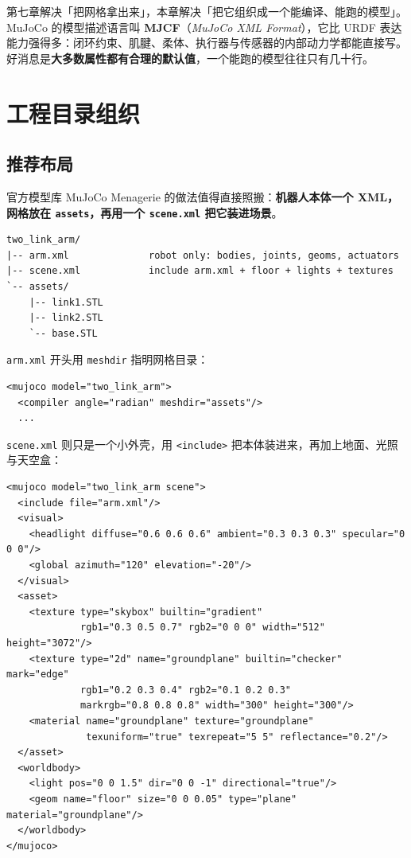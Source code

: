 
第七章解决「把网格拿出来」，本章解决「把它组织成一个能编译、能跑的模型」。MuJoCo 的模型描述语言叫 \textbf{MJCF}（\textit{MuJoCo XML Format}），它比 URDF 表达能力强得多：闭环约束、肌腱、柔体、执行器与传感器的内部动力学都能直接写。好消息是\textbf{大多数属性都有合理的默认值}，一个能跑的模型往往只有几十行。

\section{工程目录组织}

\subsection{推荐布局}

官方模型库 MuJoCo Menagerie 的做法值得直接照搬：\textbf{机器人本体一个 XML，网格放在 \texttt{assets}，再用一个 \texttt{scene.xml} 把它装进场景}。

\begin{lstlisting}[style=code]
two_link_arm/
|-- arm.xml              robot only: bodies, joints, geoms, actuators
|-- scene.xml            include arm.xml + floor + lights + textures
`-- assets/
    |-- link1.STL
    |-- link2.STL
    `-- base.STL
\end{lstlisting}

\texttt{arm.xml} 开头用 \texttt{meshdir} 指明网格目录：

\begin{lstlisting}[style=xml]
<mujoco model="two_link_arm">
  <compiler angle="radian" meshdir="assets"/>
  ...
\end{lstlisting}

\texttt{scene.xml} 则只是一个小外壳，用 \texttt{<include>} 把本体装进来，再加上地面、光照与天空盒：

\begin{lstlisting}[style=xml]
<mujoco model="two_link_arm scene">
  <include file="arm.xml"/>
  <visual>
    <headlight diffuse="0.6 0.6 0.6" ambient="0.3 0.3 0.3" specular="0 0 0"/>
    <global azimuth="120" elevation="-20"/>
  </visual>
  <asset>
    <texture type="skybox" builtin="gradient"
             rgb1="0.3 0.5 0.7" rgb2="0 0 0" width="512" height="3072"/>
    <texture type="2d" name="groundplane" builtin="checker" mark="edge"
             rgb1="0.2 0.3 0.4" rgb2="0.1 0.2 0.3"
             markrgb="0.8 0.8 0.8" width="300" height="300"/>
    <material name="groundplane" texture="groundplane"
              texuniform="true" texrepeat="5 5" reflectance="0.2"/>
  </asset>
  <worldbody>
    <light pos="0 0 1.5" dir="0 0 -1" directional="true"/>
    <geom name="floor" size="0 0 0.05" type="plane" material="groundplane"/>
  </worldbody>
</mujoco>
\end{lstlisting}

